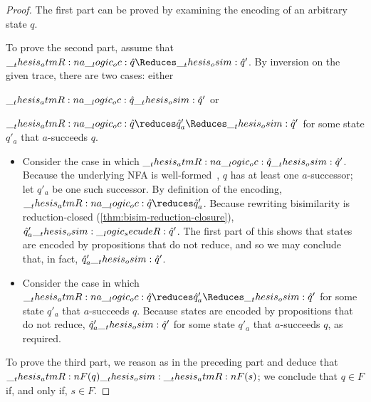 \begin{proof}
  The first part can be proved by examining the encoding of an arbitrary state $q$.

  To prove the second part, assume that $\atmR{a} \oc \defp{q} \Reduces\osim \defp{q}'$.
  By inversion on the given trace, there are two cases: either
  \begin{enumerate*}[label=\emph{(\roman*)}]
  \item $\__thesis_atmR:n {a} \__logic_oc: \hat{q} \__thesis_osim: \hat{q}'$ or
  \item $\atmR{a} \oc \defp{q} \reduces \defp{q}'_a \Reduces\osim \defp{q}'$ for some state $q'_a$ that $a$-succeeds $q$.
  \end{enumerate*}
  \begin{itemize}
  \item
    Consider the case in which $\__thesis_atmR:n {a} \__logic_oc: \hat{q} \__thesis_osim: \hat{q}'$.
    Because the underlying \ac{NFA} is well-formed~, $q$ has at least one $a$-successor;
    let $q'_a$ be one such successor.
    By definition of the encoding, $\atmR{a} \oc \defp{q} \reduces \defp{q}'_a$.
    Because rewriting bisimilarity is reduction-closed (\cref{thm:bisim-reduction-closure}), $\hat{q}'_a \__thesis_osim:\__logic_secudeR: \hat{q}'$.
    The first part of this  shows that states are encoded by propositions that do not reduce, and so we may conclude that, in fact, $\hat{q}'_a \__thesis_osim: \hat{q}'$.

  \item 
    Consider the case in which $\atmR{a} \oc \defp{q} \reduces \defp{q}'_a \Reduces\osim \defp{q}'$ for some state $q'_a$ that $a$-succeeds $q$.
    Because states are encoded by propositions that do not reduce, $\hat{q}'_a \__thesis_osim: \hat{q}'$ for some state $q'_a$ that $a$-succeeds $q$, as required.
  \end{itemize}

  To prove the third part, we reason as in the preceding part and deduce that $\__thesis_atmR:n {F}(q) \__thesis_osim: \__thesis_atmR:n {F}(s)$;
  we conclude that $q \in F$ if, and only if, $s \in F$.
\end{proof}
